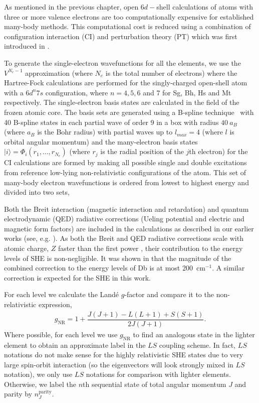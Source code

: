 \documentclass[10pt,a4paper, twoside, openright]{report}
\begin{document}
As mentioned in the previous chapter, open $6d-$shell calculations of atoms with  three or more valence electrons are too computationally expensive for established many-body methods. This computational cost is reduced using a combination of configuration interaction (CI) and perturbation theory (PT) which was first introduced in \cite{DBHF2017}. 

To generate the single-electron wavefunctions for all the elements,  we use the $V^{N_e-1}$ approximation (where $N_e$ is the total number of electrons) \cite{Kelly1964, Dzuba2005} where the Hartree-Fock calculations are performed for the singly-charged open-shell atom with a   $6d^n7s$ configuration, where $n=4,5,6$ and $7$ for Sg, Bh, Hs and Mt respectively. The  single-electron basis states are calculated in the field of the frozen atomic core. The basis sets are generated using a  B-spline technique~\cite{Johnson1988}  with 40 B-spline states in each partial wave of order 9 in a box with radius $40 \ a_B$ (where $a_B$ is the Bohr radius) with partial waves up to $l_{max}=4$ (where $l$ is orbital angular momentum) and the many-electron basis states $|i \rangle = \Phi_i(r_1,\dots,r_{N_e})$ (where $r_j$ is the radial position of the $j$th electron)  for the CI calculations are formed by making all possible single and double excitations from reference low-lying non-relativistic configurations of the atom. This set of many-body electron wavefunctions is ordered from lowest to highest energy and divided into two sets, 


Both the Breit interaction (magnetic interaction and retardation)\cite{Breit1929, Mann1971}  and quantum electrodynamic (QED) radiative corrections  (Ueling potential and electric and magnetic form factors) \cite{FG2005} are included in the calculations as described in our earlier works (see, e.g. \cite{FF113-115}).  As both the Breit and QED radiative corrections scale with atomic charge, $Z$ faster than the first power \cite{FF113-115}, their contribution to the energy levels of SHE is non-negligible. It was shown in \cite{LDFDb2018} that the magnitude of the combined correction to the energy levels of Db is at most  200~cm$^{-1}$.  A similar correction is expected for the SHE in this work.

For each level we calculate the Land\'{e} $g$-factor and compare it to the non-relativistic expression,
\begin{align} \label{eq:Lande}
g_{\text{NR}} =  1 + \dfrac{J(J + 1) - L(L+1) + S(S+1)}{2J(J+1)}.
\end{align}
Where possible, for each level we use $g_{\text{NR}}$ to find an analogous state in the lighter element to obtain an approximate label in the $LS$ coupling scheme. In fact, $LS$ notations do not make sense for the highly relativistic SHE states due to very large spin-orbit interaction (so the eigenvectors will look strongly mixed in $LS$ notation), we only use $LS$ notations for comparison with lighter elements. Otherwise, we label the $n$th sequential state of total angular momentum $J$ and parity by $n_{J}^{\text{parity}}$.
\end{document}

